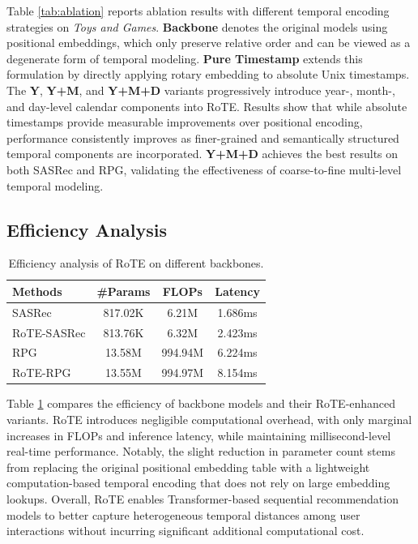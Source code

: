 \documentclass[sigconf,natbib=true]{acmart}
\begin{document}
Table \ref{tab:ablation} reports ablation results with different temporal encoding strategies on \textit{Toys and Games}. 
\textbf{Backbone} denotes the original models using positional embeddings, which only preserve relative order and can be viewed as a degenerate form of temporal modeling. 
\textbf{Pure Timestamp} extends this formulation by directly applying rotary embedding to absolute Unix timestamps.
The \textbf{Y}, \textbf{Y+M}, and \textbf{Y+M+D} variants progressively introduce year-, month-, and day-level calendar components into RoTE. 
Results show that while absolute timestamps provide measurable improvements over positional encoding, performance consistently improves as finer-grained and semantically structured temporal components are incorporated. 
\textbf{Y+M+D} achieves the best results on both SASRec and RPG, validating the effectiveness of coarse-to-fine multi-level temporal modeling.

\subsection{Efficiency Analysis}

\begin{table}[t]
\centering
\caption{Efficiency analysis of RoTE on different backbones.}
\label{tab:efficiency}
\begin{tabular}{lccc}
\toprule
\textbf{Methods} & \textbf{\#Params} & \textbf{FLOPs} & \textbf{Latency} \\
\midrule
SASRec            & 817.02K & 6.21M & 1.686ms \\
RoTE-SASRec     & 813.76K & 6.32M & 2.423ms \\
\midrule
RPG               & 13.58M & 994.94M & 6.224ms \\
RoTE-RPG         & 13.55M & 994.97M & 8.154ms \\
\bottomrule
\end{tabular}
\end{table}

Table \ref{tab:efficiency} compares the efficiency of backbone models and their RoTE-enhanced variants. RoTE introduces negligible computational overhead, with only marginal increases in FLOPs and inference latency, while maintaining millisecond-level real-time performance. Notably, the slight reduction in parameter count stems from replacing the original positional embedding table with a lightweight computation-based temporal encoding that does not rely on large embedding lookups. Overall, RoTE enables Transformer-based sequential recommendation models to better capture heterogeneous temporal distances among user interactions without incurring significant additional computational cost.
\end{document}
